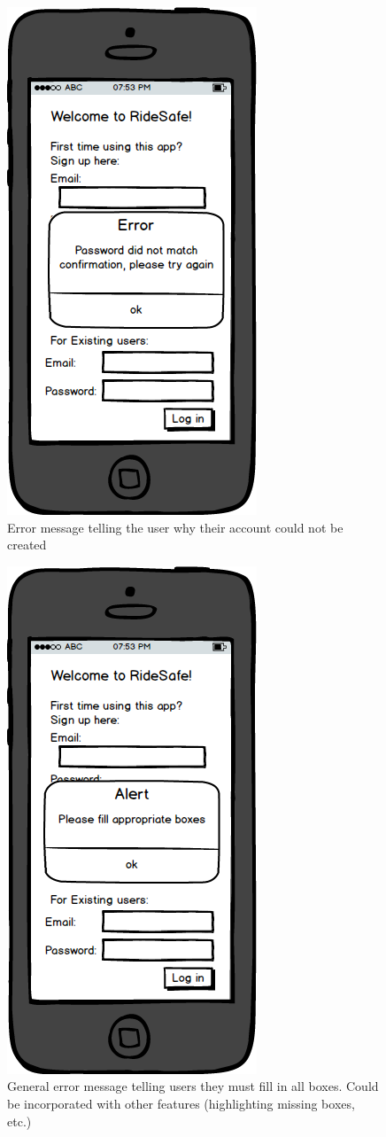 \documentclass[a4paper]{report}
\begin{document}
\clearpage
\begin{figure}
\centering
\includegraphics[scale=0.9]{figures/prototype_2/pass_conf_err}
\caption{Error message telling the user why their account could not be created}
\end{figure}
\clearpage
\begin{figure}
\centering
\includegraphics[scale=0.9]{figures/prototype_2/missing_err}
\caption{General error message telling users they must fill in all boxes. Could be incorporated with other features (highlighting missing boxes, etc.)}
\end{figure}
\end{document}
